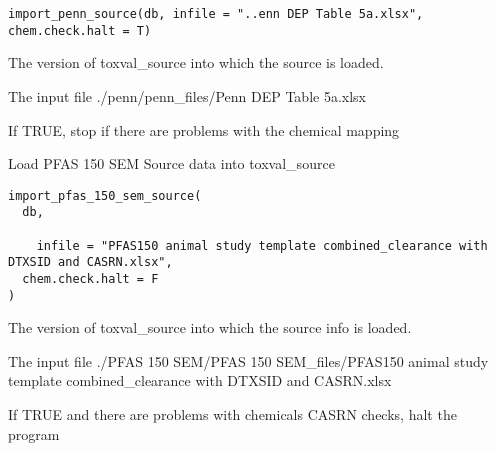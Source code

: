 \documentclass[letterpaper]{book}
\begin{document}
%
\begin{Usage}
\begin{verbatim}
import_penn_source(db, infile = "..enn DEP Table 5a.xlsx", chem.check.halt = T)
\end{verbatim}
\end{Usage}
%
\begin{Arguments}
\begin{ldescription}
\item[\code{db}] The version of toxval\_source into which the source is loaded.

\item[\code{infile}] The input file ./penn/penn\_files/Penn DEP Table 5a.xlsx

\item[\code{chem.check.halt}] If TRUE, stop if there are problems with the chemical mapping
\end{ldescription}
\end{Arguments}
%
\begin{Description}\relax
Load PFAS 150 SEM Source data into toxval\_source
\end{Description}
%
\begin{Usage}
\begin{verbatim}
import_pfas_150_sem_source(
  db,
 
    infile = "PFAS150 animal study template combined_clearance with DTXSID and CASRN.xlsx",
  chem.check.halt = F
)
\end{verbatim}
\end{Usage}
%
\begin{Arguments}
\begin{ldescription}
\item[\code{db}] The version of toxval\_source into which the source info is loaded.

\item[\code{infile}] The input file ./PFAS 150 SEM/PFAS 150 SEM\_files/PFAS150 animal study template combined\_clearance with DTXSID and CASRN.xlsx

\item[\code{chem.check.halt}] If TRUE and there are problems with chemicals CASRN checks, halt the program
\end{ldescription}
\end{Arguments}
\end{document}
